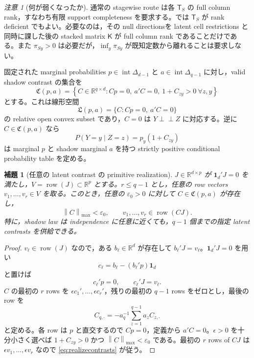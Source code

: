 \documentclass[11pt,a4paper]{ltjsarticle}
\newtheorem{lemma}{補題}[section]
\theoremstyle{remark}
\newtheorem{remark}{注意}[section]
\newcommand{\R}{\mathbb R}
\newcommand{\ind}{\perp\!\!\!\perp}
\newcommand{\one}{\bm 1}
\newcommand{\norm}[1]{\left\lVert#1\right\rVert}
\newcommand{\row}{\operatorname{row}}
\begin{document}
\begin{remark}[何が弱くなったか]\label{rem:selectioncancelweak}
通常の stagewise route は各 $\mathsf T_S$ の full column rank，すなわち有限 support completeness を要求する。では $\mathsf T_S$ が rank deficient でもよい。必要なのは，その null directionsを latent cell restrictions と同時に課した後の stacked matrix $\mathsf K$ が full column rank であることだけである。また $\pi_{Sy}>0$ は必要だが，$\inf_y\pi_{Sy}$ が既知定数から離れることは要求しない。
\end{remark}

固定された marginal probabilities $p\in\operatorname{int}\Delta_{d-1}$ と $a\in\operatorname{int}\Delta_{q-1}$ に対し，valid shadow contrast の集合を
\begin{equation}
\mathfrak C(p,a)
=\left\{C\in\R^{q\times d}:
Cp=0,
\ a'C=0,
\ 1+C_{zy}>0\ \forall z,y
\right\}
\label{eq:admissibleC}
\end{equation}
とする。これは線形空間
\[
\mathfrak L(p,a)=\{C:Cp=0,\ a'C=0\}
\]
の relative open convex subset であり，$C=0$ は $Y\ind Z$ に対応する。逆に $C\in\mathfrak C(p,a)$ なら
\begin{equation}
P(Y=y\mid Z=z)=p_y(1+C_{zy})
\label{eq:CtoQ}
\end{equation}
は marginal $p$ と shadow marginal $a$ を持つ strictly positive conditional probability table を定める。

\begin{lemma}[任意の latent contrast の primitive realization]\label{lem:contrastrealization}
$J\in\R^{d\times p}$ が $\one_d'J=0$ を満たし，$V=\row(J)\subset\R^p$ とする。$r\le q-1$ とし，任意の row vectors $v_1,\ldots,v_r\in V$ を取る。このとき，任意の $\varepsilon_0>0$ に対して $C\in\mathfrak C(p,a)$ が存在し，
\begin{equation}
\norm{C}_{\max}<\varepsilon_0,
\qquad
v_1,\ldots,v_r\in\row(CJ).
\label{eq:realizecontrasts}
\end{equation}
特に，shadow law は independence に任意に近くても，$q-1$ 個までの指定 latent contrasts を供給できる。
\end{lemma}

\begin{proof}
$v_\ell\in\row(J)$ なので，ある $b_\ell\in\R^d$ が存在して $b_\ell'J=v_\ell$。$\one_d'J=0$ を用い
\[
c_\ell=b_\ell-(b_\ell'p)\one_d
\]
と置けば
\[
c_\ell'p=0,
\qquad
c_\ell'J=v_\ell.
\]
$C$ の最初の $r$ rows を $\epsilon c_1',\ldots,\epsilon c_r'$，残りの最初の $q-1$ rows をゼロとし，最後の row を
\[
C_{q,\cdot}
=-a_q^{-1}\sum_{z=1}^{q-1}a_zC_{z,\cdot}
\]
と定める。各 row は $p$ と直交するので $Cp=0$，定義から $a'C=0$。$\epsilon>0$ を十分小さく選べば $1+C_{zy}>0$ かつ $\norm{C}_{\max}<\varepsilon_0$ である。最初の $r$ rows of $CJ$ は $\epsilon v_1,\ldots,\epsilon v_r$ なので \eqref{eq:realizecontrasts} が従う。
\end{proof}
\end{document}
